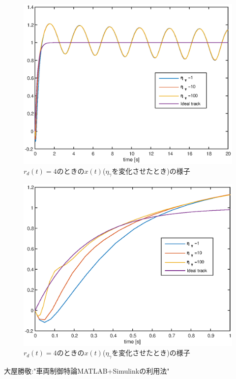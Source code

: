 \documentclass[a4paper,12pt]{jarticle}
\begin{document}
%
%
\begin{figure}[htb]
    \begin{center}
       \includegraphics[width=140mm]{fig/x_rd4_Etag.eps}
        \caption{$r_d(t)=4$のときの$x(t)$($\eta_\gamma$を変化させたとき)の様子}
        \label{fig:x_rd4etab}
    \end{center}
\end{figure}
%
%
\begin{figure}[htb]
    \begin{center}
	 \includegraphics[width=140mm]{fig/x_rd4_Etag_2.eps}
        \caption{$r_d(t)=4$のときの$x(t)$($\eta_\gamma$を変化させたとき)の様子}
        \label{fig:x_rd4etag2}
    \end{center}
\end{figure}
%
\begin{thebibliography}{99}

  大屋勝敬:"車両制御特論MATLAB+Simulinkの利用法"
\end{thebibliography}
\end{document}
